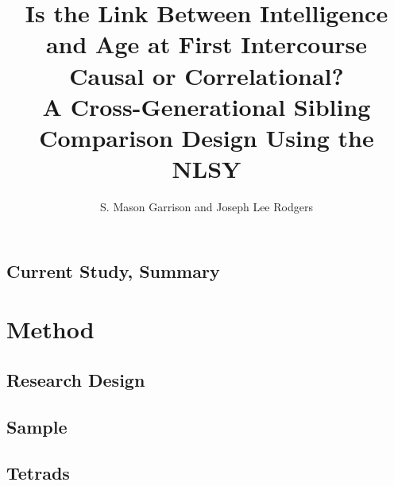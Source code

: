 \documentclass[a4paper,man,apacite,natbib,12pt,longtable]{apa6}\usepackage[]{graphicx}\usepackage[]{color}
\title{Is the Link Between Intelligence and Age at First Intercourse Causal or Correlational? \\ A Cross-Generational Sibling Comparison Design Using the NLSY}
\author{S. Mason Garrison and Joseph Lee Rodgers}
\affiliation{Vanderbilt University}
\begin{document}
\maketitle
%











\section{ }\vspace{-.8cm}

\subsection{Current Study, Summary}


\section{Method}
\subsection{Research Design}

%
\subsection{Sample}

%
\subsection{Tetrads}

%
\end{document}
